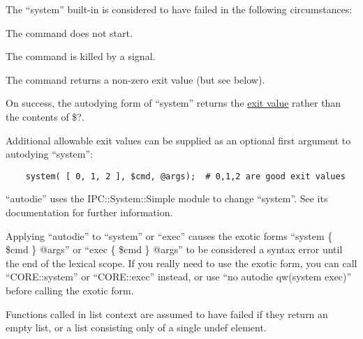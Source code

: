 \documentclass[]{article}
\renewcommand{\emph}[1]{\underline{#1}}
\begin{document}
The ``system'' built-in is considered to have failed in the following
circumstances:

\begin{description}
\itemsep1pt\parskip0pt
\item[•]
The command does not start.
\end{description}

\begin{description}
\itemsep1pt\parskip0pt
\item[•]
The command is killed by a signal.
\end{description}

\begin{description}
\itemsep1pt\parskip0pt
\item[•]
The command returns a non-zero exit value (but see below).
\end{description}

On success, the autodying form of ``system'' returns the \emph{exit
value} rather than the contents of \$?.

Additional allowable exit values can be supplied as an optional first
argument to autodying ``system'':

\begin{verbatim}
    system( [ 0, 1, 2 ], $cmd, @args);  # 0,1,2 are good exit values
\end{verbatim}

``autodie'' uses the IPC::System::Simple module to change ``system''.
See its documentation for further information.

Applying ``autodie'' to ``system'' or ``exec'' causes the exotic forms
``system \{ \$cmd \} @args'' or ``exec \{ \$cmd \} @args'' to be
considered a syntax error until the end of the lexical scope. If you
really need to use the exotic form, you can call ``CORE::system'' or
``CORE::exec'' instead, or use ``no autodie qw(system exec)'' before
calling the exotic form.


Functions called in list context are assumed to have failed if they
return an empty list, or a list consisting only of a single undef
element.

\end{document}
